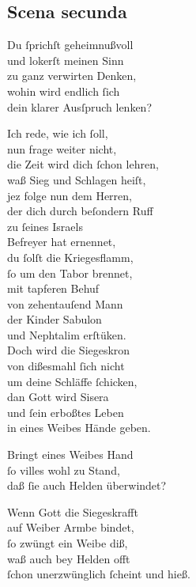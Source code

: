\documentclass{ees}
\newenvironment{lyrics}[1]{%
  \subsection{#1}\nopagebreak%
  \begin{lyricslist}%
  \let\voice\item%
}{%
  \end{lyricslist}%
}
\begin{document}
\begin{lyrics}{Scena secunda}
  \voice[Barak]
  Du ſprichſt geheimnußvoll\\
  und lokerſt meinen Sinn\\
  zu ganz verwirten Denken,\\
  wohin wird endlich ſich\\
  dein klarer Ausſpruch lenken?

  \voice[Debora]
  Ich rede, wie ich ſoll,\\
  nun frage weiter nicht,\\
  die Zeit wird dich ſchon lehren,\\
  waß Sieg und Schlagen heiſt,\\
  jez folge nun dem Herren,\\
  der dich durch beſondern Ruff\\
  zu ſeines Israels\\
  Befreyer hat ernennet,\\
  du ſolſt die Kriegesflamm,\\
  ſo um den Tabor brennet,\\
  mit tapferen Behuf\\
  von zehentauſend Mann\\
  der Kinder Sabulon\\
  und Nephtalim erſtüken.\\
  Doch wird die Siegeskron\\
  von dißesmahl ſich nicht\\
  um deine Schläffe ſchicken,\\
  dan Gott wird Sisera\\
  und ſein erboßtes Leben\\
  in eines Weibes Hände geben.

  \voice[Barak]
  Bringt eines Weibes Hand\\
  ſo villes wohl zu Stand,\\
  daß ſie auch Helden überwindet?

  \voice[Debora]
  Wenn Gott die Siegeskrafft\\
  auf Weiber Armbe bindet,\\
  ſo zwüngt ein Weibe diß,\\
  waß auch bey Helden offt\\
  ſchon unerzwünglich ſcheint und hieß.
\end{lyrics}
\end{document}
